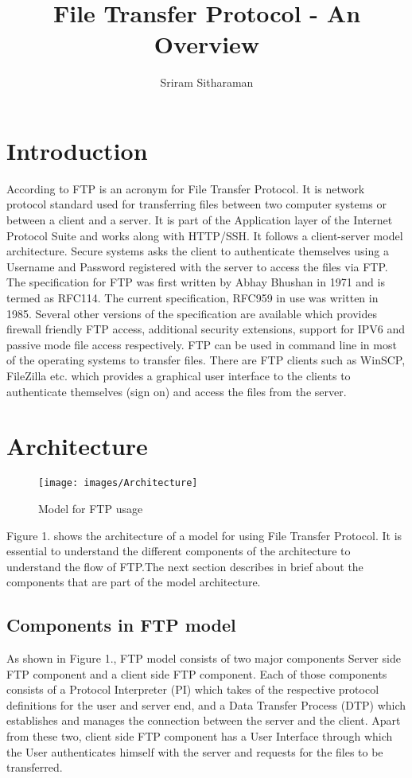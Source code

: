 \documentclass[9pt,twocolumn,twoside]{styles/osajnl}
\title{File Transfer Protocol - An Overview}
\author[1,*]{Sriram Sitharaman}
\affil[1]{School of Informatics and Computing, Bloomington, IN 47408, U.S.A.}
\affil[*]{Corresponding authors: srirsith@iu.edu}
\begin{document}
\maketitle
\tableofcontents %
\section{Introduction}
According to \cite{www-wiki-ftp} FTP is an acronym for File Transfer Protocol. It is network protocol standard used for transferring files between two computer systems or between a client and a server. It is part of the Application layer of the Internet Protocol Suite and works along with HTTP/SSH. It follows a client-server model architecture. Secure systems asks the client to authenticate themselves using a Username and Password registered with the server to access the files via FTP. The specification for FTP was first written by  Abhay Bhushan \cite{www-rfc114} in 1971 and is termed as RFC114. The current specification, RFC959 in use was written in 1985. Several other versions of the specification are available which provides firewall friendly FTP access, additional security extensions, support for IPV6 and passive mode file access respectively. FTP can be used in command line in most of the operating systems to transfer files. There are FTP clients such as WinSCP, FileZilla etc. which provides a graphical user interface to the clients to authenticate themselves (sign on) and access the files from the server.


\section{Architecture}

\begin{figure*}[hbt]
\begin{center}
\centering
\texttt{[image: images/Architecture]}
\caption{Model for FTP usage \cite{www-rfc959}}
\end{center}
\end{figure*}

Figure 1. shows the architecture of a model for using File Transfer Protocol. It is essential to understand the different components of the architecture to understand the flow of FTP.The next section describes in brief about the components that are part of the model architecture.

\subsection{Components in FTP model}
As shown in Figure 1., FTP model consists of two major components Server side FTP component and a client side FTP component. Each of those components consists of a Protocol Interpreter (PI) which takes of the respective protocol definitions for the user and server end, and a Data Transfer Process (DTP) which establishes and manages the connection between the server and the client. Apart from these two, client side FTP component has a User Interface through which the User authenticates himself with the server and requests for the files to be transferred.
\end{document}
